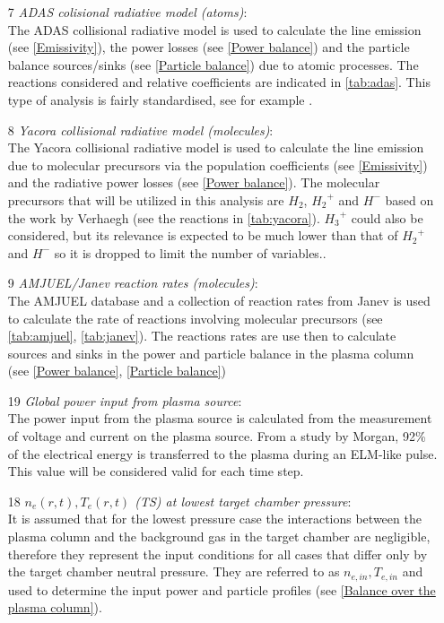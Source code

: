 \begin{enumerate}
    \item[7] \emph{ADAS colisional radiative model (atoms)}: \\The ADAS collisional radiative model\cite{Summers2004,OMullane2013} is used to calculate the line emission (see \autoref{Emissivity}), the power losses (see \autoref{Power balance}) and the particle balance sources/sinks (see \autoref{Particle balance}) due to atomic processes. The reactions considered and relative coefficients are indicated in \autoref{tab:adas}. This type of analysis is fairly standardised, see for example \cite{Verhaegh2018}.
    \item[8] \emph{Yacora collisional radiative model (molecules)}: \\The Yacora collisional radiative model\cite{Wunderlich2016,Wunderlich2020} is used to calculate the line emission due to molecular precursors via the population coefficients (see \autoref{Emissivity}) and the radiative power losses (see \autoref{Power balance}). The molecular precursors that will be utilized in this analysis are $H_2$, ${H_2}^+$ and $H^-$ based on the work by Verhaegh \cite{Verhaegh2021} (see the reactions in \autoref{tab:yacora}). ${H_3}^+$ could also be considered, but its relevance is expected to be much lower than that of ${H_2}^+$ and $H^-$ so it is dropped to limit the number of variables.\cite{Verhaegh2021}.
    \item[9] \emph{AMJUEL/Janev reaction rates (molecules)}: \\The AMJUEL database and a collection of reaction rates from Janev \cite{Janev2003} is used to calculate the rate of reactions involving molecular precursors (see \autoref{tab:amjuel}, \ref{tab:janev}). The reactions rates are use then to calculate sources and sinks in the power and particle balance in the plasma column (see \autoref{Power balance}, \ref{Particle balance})
    \item[19] \emph{Global power input from plasma source}: \\The power input from the plasma source is calculated from the measurement of voltage and current on the plasma source. From a study  by Morgan\cite{Morgan2014}, 92\% of the electrical energy is transferred to the plasma during an ELM-like pulse. This value will be considered valid for each time step.
    \item[18] \emph{$n_e(r,t), T_e(r,t)$ (TS) at lowest target chamber pressure}: \\It is assumed that for the lowest pressure case the interactions between the plasma column and the background gas in the target chamber are negligible, therefore they represent the input conditions for all cases that differ only by the target chamber neutral pressure. They are referred to as $n_{e,in}, T_{e,in}$ and used to determine the input power and particle profiles (see \autoref{Balance over the plasma column}).

\end{enumerate}
